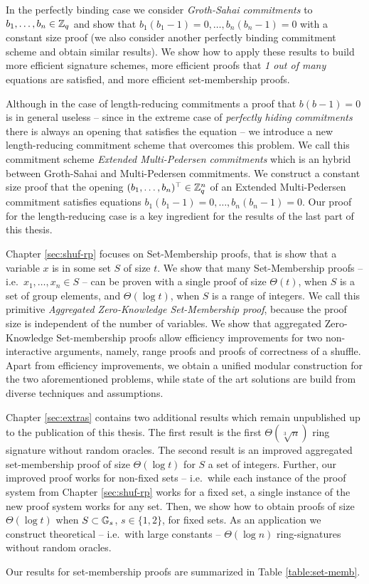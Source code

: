 In the perfectly binding case we consider \emph{Groth-Sahai commitments} to $b_1,\ldots,\allowbreak b_n\allowbreak\in\mathbb{Z}_q$ and show that $b_1(b_1-1)=0,\ldots,b_n(b_n-1)=0$ with a constant size proof (we also consider another perfectly binding commitment scheme and obtain similar results). We show how to apply these results to build more efficient signature schemes, more efficient proofs that \emph{1 out of many} equations are satisfied, and more efficient set-membership proofs.

Although in the case of length-reducing commitments a proof that $b(b-1)=0$ is in general useless -- since in the extreme case of \emph{perfectly hiding commitments} there is always an opening that satisfies the equation -- we introduce a new length-reducing commitment scheme that overcomes this problem. We call this commitment scheme \emph{Extended Multi-Pedersen commitments} which is an hybrid between Groth-Sahai and Multi-Pedersen commitments. We construct a constant size proof that the opening $(b_1,\ldots,b_n)^\top\in\mathbb{Z}_q^n$ of an Extended Multi-Pedersen commitment satisfies equations $b_1(b_1-1)=0,\ldots,b_n(b_n-1)=0$.
Our proof for the length-reducing case is a key ingredient for the results of the last part of this thesis.
 
Chapter \ref{sec:shuf-rp} focuses on Set-Membership proofs, that is show that a variable $x$ is in some set $S$ of size $t$. We show that many Set-Membership proofs -- i.e.~$x_1,\ldots,x_n\in S$ -- can be proven with a single proof of size $\Theta(t)$, when $S$ is a set of group elements, and $\Theta(\log t)$, when $S$ is a range of integers. We call this primitive \emph{Aggregated Zero-Knowledge Set-Membership proof}, because the proof size is independent of the number of variables. We show that aggregated Zero-Knowledge Set-membership proofs allow efficiency improvements for two non-interactive arguments, namely, range proofs and proofs of correctness of a shuffle. Apart from efficiency improvements, we obtain a unified modular construction for the two aforementioned problems, while state of the art solutions are build from diverse techniques and assumptions.

Chapter \ref{sec:extras} contains two additional results which remain unpublished up to the publication of this thesis. The first result is the first $\Theta(\sqrt[3]{n})$ ring signature without random oracles. The second result is an improved aggregated set-membership proof of size $\Theta(\log t)$ for $S$ a set of integers. Further, our improved proof works for non-fixed sets -- i.e.~while each instance of the proof system from Chapter \ref{sec:shuf-rp} works for a fixed set, a single instance of the new proof system works for any set. Then, we show how to obtain proofs of size $\Theta(\log t)$ when $S\subset\mathbb{G}_s$, $s\in\{1,2\}$, for fixed sets. As an application we construct theoretical -- i.e.~with large constants -- $\Theta(\log n)$ ring-signatures without random oracles.

Our results for set-membership proofs are summarized in Table \ref{table:set-memb}.


